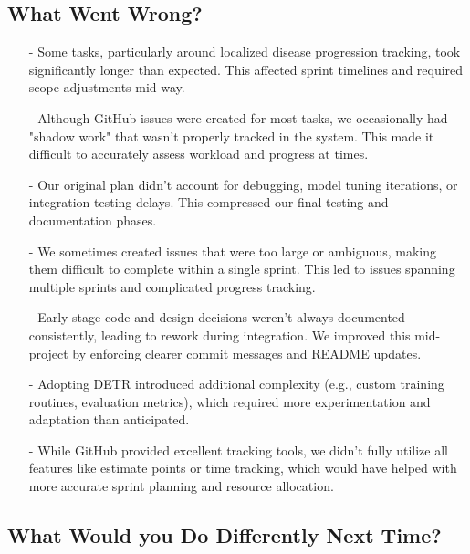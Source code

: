 \documentclass{article}
\begin{document}
\subsection{What Went Wrong?}
\begin{enumerate}
    \item[-] Some tasks, particularly around localized disease progression tracking, took significantly longer than expected. This affected sprint timelines and required scope adjustments mid-way.
    \item[-] Although GitHub issues were created for most tasks, we occasionally had "shadow work" that wasn't properly tracked in the system. This made it difficult to accurately assess workload and progress at times.
    \item[-] Our original plan didn't account for debugging, model tuning iterations, or integration testing delays. This compressed our final testing and documentation phases.
    \item[-] We sometimes created issues that were too large or ambiguous, making them difficult to complete within a single sprint. This led to issues spanning multiple sprints and complicated progress tracking.
    \item[-] Early-stage code and design decisions weren't always documented consistently, leading to rework during integration. We improved this mid-project by enforcing clearer commit messages and README updates.
    \item[-] Adopting DETR introduced additional complexity (e.g., custom training routines, evaluation metrics), which required more experimentation and adaptation than anticipated.
    \item[-] While GitHub provided excellent tracking tools, we didn't fully utilize all features like estimate points or time tracking, which would have helped with more accurate sprint planning and resource allocation.
\end{enumerate}

\subsection{What Would you Do Differently Next Time?}
\end{document}
